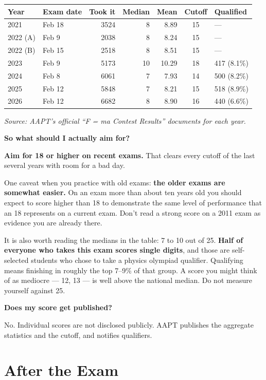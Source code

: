\documentclass[11pt]{article}
\newcommand{\Q}[1]{\par\medskip\noindent\textbf{\color{qblue}#1}\par\nobreak\vspace{1pt}\nobreak}
\begin{document}
\begin{center}
\begin{tabular}{llrrrcl}
\hline
\textbf{Year} & \textbf{Exam date} & \textbf{Took it} & \textbf{Median} & \textbf{Mean} &
\textbf{Cutoff} & \textbf{Qualified} \\
\hline
2021       & Feb 18 & 3524 & 8  & 8.89  & 15 & --- \\
2022 (A)   & Feb 9  & 2038 & 8  & 8.24  & 15 & --- \\
2022 (B)   & Feb 15 & 2518 & 8  & 8.51  & 15 & --- \\
2023       & Feb 9  & 5173 & 10 & 10.29 & 18 & 417 \; (8.1\%) \\
2024       & Feb 8  & 6061 & 7  & 7.93  & 14 & 500 \; (8.2\%) \\
2025       & Feb 12 & 5848 & 7  & 8.21  & 15 & 518 \; (8.9\%) \\
2026       & Feb 12 & 6682 & 8  & 8.90  & 16 & 440 \; (6.6\%) \\
\hline
\end{tabular}
\end{center}

\emph{Source: AAPT's official ``F = ma Contest Results'' documents for each year.}

\Q{So what should I actually aim for?}
\textbf{Aim for 18 or higher on recent exams.} That clears every cutoff of the last several
years with room for a bad day.

One caveat when you practice with old exams: \textbf{the older exams are somewhat easier.}
On an exam more than about ten years old you should expect to score higher than 18 to
demonstrate the same level of performance that an 18 represents on a current exam. Don't
read a strong score on a 2011 exam as evidence you are already there.

It is also worth reading the medians in the table: 7 to 10 out of 25. \textbf{Half of
everyone who takes this exam scores single digits}, and those are self-selected students
who chose to take a physics olympiad qualifier. Qualifying means finishing in roughly the
top 7--9\% of that group. A score you might think of as mediocre --- 12, 13 --- is well
above the national median. Do not measure yourself against 25.

\Q{Does my score get published?}
No. Individual scores are not disclosed publicly. AAPT publishes the aggregate statistics
and the cutoff, and notifies qualifiers.

\section{After the Exam}
\end{document}
